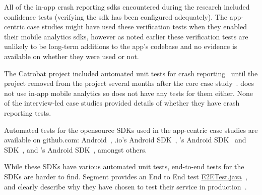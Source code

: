 All of the in-app crash reporting \Gls{sdk}s encountered during the research included confidence tests (verifying the \Gls{sdk} has been configured adequately). The app-centric case studies might have used these verification tests when they enabled their mobile analytics \Gls{sdk}s, however as noted earlier these verification tests are unlikely to be long-term additions to the app's codebase and no evidence is available on whether they were used or not. 

The Catrobat project included automated unit tests for crash reporting~ until the project removed  from the project several months after the core case study~.  does not use in-app mobile analytics so does not have any tests for them either. None of the interview-led case studies provided details of whether they have crash reporting tests.

Automated tests for the opensource SDKs used in the app-centric case studies are available on github.com:  Android~, .io's Android SDK~, 's Android SDK~ and  SDK~, and 's Android SDK~, amongst others. 

While these SDKs have various automated unit tests, end-to-end tests for the SDKs are harder to find. Segment provides an End to End test  \href{https://github.com/segmentio/analytics-android/blob/master/analytics-samples/analytics-sample/src/androidTest/java/com/segment/analytics/E2ETest.java}{E2ETest.java}~, and clearly describe why they have chosen to test their service in production~.  


